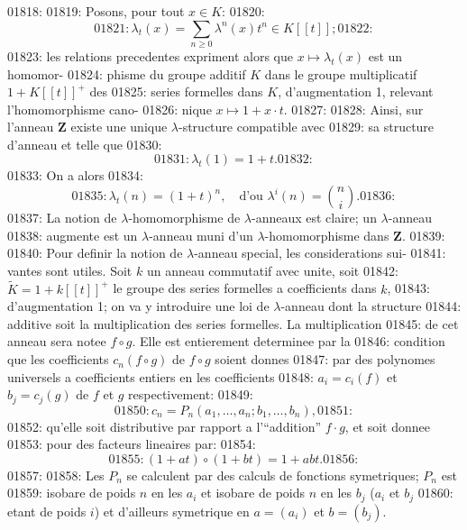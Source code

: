 01818: 
01819: Posons, pour tout $x \in K$:
01820: \begin{equation}
01821: \lambda_t(x) = \sum_{n \geq 0} \lambda^n(x) t^n \in K[[t]];
01822: \end{equation}
01823: les relations precedentes expriment alors que $x \mapsto \lambda_t(x)$ est un homomor-
01824: phisme du groupe additif $K$ dans le groupe multiplicatif $1 + K[[t]]^{+}$ des
01825: series formelles dans $K$, d'augmentation 1, relevant l'homomorphisme cano-
01826: nique $x \mapsto 1 + x \cdot t$.
01827: 
01828: Ainsi, sur l'anneau $\mathbf{Z}$ existe une unique $\lambda$-structure compatible avec
01829: sa structure d'anneau et telle que
01830: \[
01831: \lambda_t(1) = 1 + t.
01832: \]
01833: On a alors
01834: \begin{equation}
01835: \lambda_t(n) = (1+t)^n, \quad \text{d'ou } \lambda^i(n) = \binom{n}{i}.
01836: \end{equation}
01837: La notion de $\lambda$-homomorphisme de $\lambda$-anneaux est claire; un $\lambda$-anneau
01838: augmente est un $\lambda$-anneau muni d'un $\lambda$-homomorphisme dans $\mathbf{Z}$.
01839: 
01840: Pour definir la notion de $\lambda$-anneau special, les considerations sui-
01841: vantes sont utiles. Soit $k$ un anneau commutatif avec unite, soit
01842: $\widetilde{K} = 1 + k[[t]]^{+}$ le groupe des series formelles a coefficients dans $k$,
01843: d'augmentation 1; on va y introduire une loi de $\lambda$-anneau dont la structure
01844: additive soit la multiplication des series formelles. La multiplication
01845: de cet anneau sera notee $f \circ g$. Elle est entierement determinee par la
01846: condition que les coefficients $c_n(f \circ g)$ de $f \circ g$ soient donnes
01847: par des polynomes universels a coefficients entiers en les coefficients
01848: $a_i = c_i(f)$ et $b_j = c_j(g)$ de $f$ et $g$ respectivement:
01849: \begin{equation}
01850: c_n = P_n(a_1, \ldots, a_n; b_1, \ldots, b_n),
01851: \end{equation}
01852: qu'elle soit distributive par rapport a l'``addition'' $f \cdot g$, et soit donnee
01853: pour des facteurs lineaires par:
01854: \begin{equation}
01855: (1 + at) \circ (1 + bt) = 1 + abt.
01856: \end{equation}
01857: 
01858: Les $P_n$ se calculent par des calculs de fonctions symetriques; $P_n$ est
01859: isobare de poids $n$ en les $a_i$ et isobare de poids $n$ en les $b_j$ ($a_i$ et $b_j$
01860: etant de poids $i$) et d'ailleurs symetrique en $a = (a_i)$ et $b = (b_j)$.
